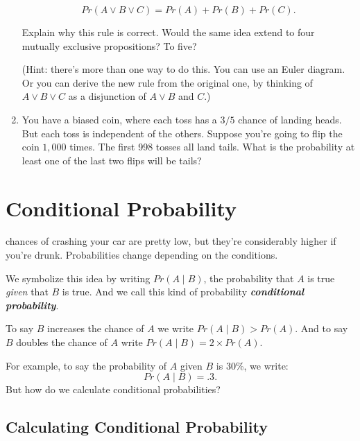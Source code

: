 \documentclass[justified]{tufte-book}
\newcommand{\given}{\mid}
\newcommand{\gt}{>}
\newcommand{\p}{Pr}
\theoremstyle{definition}
\theoremstyle{definition}
\theoremstyle{definition}
\theoremstyle{remark}
\begin{document}
\begin{enumerate}
  \[ \p(A \vee B \vee C) = \p(A) + \p(B) + \p(C).\]

  Explain why this rule is correct. Would the same idea extend to four mutually exclusive propositions? To five?

  (Hint: there's more than one way to do this. You can use an Euler diagram. Or you can derive the new rule from the original one, by thinking of \(A \vee B \vee C\) as a disjunction of \(A \vee B\) and \(C\).)
\item
  You have a biased coin, where each toss has a \(3/5\) chance of landing heads. But each toss is independent of the others. Suppose you're going to flip the coin \(1,000\) times. The first 998 tosses all land tails. What is the probability at least one of the last two flips will be tails?
\end{enumerate}

\hypertarget{conditional-probability}{%
\chapter{Conditional Probability}\label{conditional-probability}}

 chances of crashing your car are pretty low, but they're considerably higher if you're drunk. Probabilities change depending on the conditions.

We symbolize this idea by writing \(\p(A \given B)\), the probability that \(A\) is true \emph{given} that \(B\) is true. And we call this kind of probability \textbf{\emph{conditional probability}}.

\begin{marginfigure}
To say \(B\) increases the chance of \(A\) we write
\(\p(A \given B) \gt \p(A)\). And to say \(B\) doubles the chance of
\(A\) write \(\p(A \given B) = 2 \times \p(A)\).
\end{marginfigure}

For example, to say the probability of \(A\) given \(B\) is 30\%, we write:
\[ \p(A \given B) = .3. \]
But how do we calculate conditional probabilities?

\hypertarget{calculating-conditional-probability}{%
\section{Calculating Conditional Probability}\label{calculating-conditional-probability}}
\end{document}
